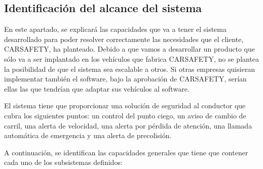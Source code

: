 \subsection {Identificación del alcance del sistema}
\par En este apartado, se explicará las capacidades que va a tener el sistema desarrollado para poder resolver correctamente las necesidades que el cliente, CARSAFETY, ha planteado. Debido a que vamos a desarrollar un producto que sólo va a ser implantado en los vehículos que fabrica CARSAFETY, no se plantea la posibilidad de que el sistema sea escalable a otros. Si otras empresas quisieran implementar también el software, bajo la aprobación de CARSAFETY, serían ellas las que tendrían que adaptar sus vehículos al software.
\par El sistema tiene que proporcionar una solución de seguridad al conductor que cubra los siguientes puntos: un control del punto ciego, un aviso de cambio de carril, una alerta de velocidad, una alerta por pérdida de atención, una llamada automática de emergencia y una alerta de precolisión.
\par A continuación, se identifican las capacidades generales que tiene que contener cada uno de los subsistemas definidos:

